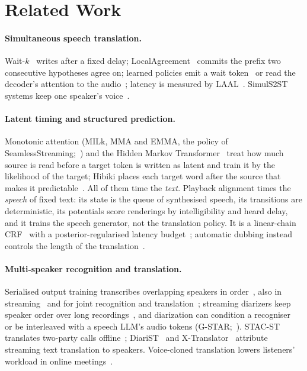 \section{Related Work}
\label{sec:related}

\paragraph{Simultaneous speech translation.} Wait-$k$~\citep{ma2019stacl} writes after a fixed delay;
LocalAgreement~\citep{liu2020low,polak2022cuni,machacek2023turning} commits the prefix two consecutive hypotheses agree
on; learned policies emit a wait token~\citep{koshkin2024transllama} or read the decoder's attention to the
audio~\citep{papi2023edatt,papi2024streamatt}; latency is measured by LAAL~\citep{papi2022over}. SimulS2ST systems
keep one speaker's voice~\citep{zhang2024streamspeech,seamless2023,labiausse2025hibiki,cheng2025liveinterpret,he2026simuls2st,deng2025simuls2s}.

\paragraph{Latent timing and structured prediction.} Monotonic attention (MILk, MMA and EMMA, the policy of
SeamlessStreaming;~\citealp{arivazhagan2019milk,ma2020mma,ma2023emma}) and the Hidden Markov
Transformer~\citep{zhang2023hmt} treat how much source is read before a target token is written as latent and train it
by the likelihood of the target; Hibiki places each target word after the source that makes it
predictable~\citep{labiausse2025hibiki}. All of them time the \emph{text}. Playback alignment times the \emph{speech} of
fixed text: its state is the queue of synthesised speech, its transitions are deterministic, its potentials score
renderings by intelligibility and heard delay, and it trains the speech generator, not the translation policy. It is a
linear-chain CRF~\citep{lafferty2001crf} with a posterior-regularised latency budget~\citep{ganchev2010posterior};
automatic dubbing instead controls the length of the translation~\citep{lakew2022isometric}.

\paragraph{Multi-speaker recognition and translation.} Serialised output training transcribes overlapping speakers
in order~\citep{kanda2020sot,kanda2021saasr}, also in streaming~\citep{kanda2022tsot} and for joint recognition and
translation~\citep{papi2023tsot}; streaming diarizers keep speaker order over long
recordings~\citep{park2024sortformer,medennikov2025streaming,medennikov2026nemotron}, and diarization can condition a
recogniser~\citep{polok2026dicow,huo2026tagspeech} or be interleaved with a speech LLM's audio tokens
(G-STAR;~\citealp{peng2026gstar}). STAC-ST translates two-party calls offline~\citep{zuluaga2023stac};
DiariST~\citep{yang2024diarist} and X-Translator~\citep{zhao2026xtranslator} attribute streaming text translation to
speakers. Voice-cloned translation lowers listeners' workload in online meetings~\citep{ma2026samevoice}.
